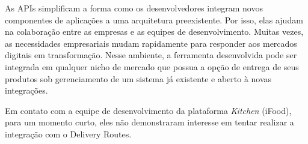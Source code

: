 As APIs simplificam a forma como os desenvolvedores integram novos componentes de aplicações a uma arquitetura preexistente. Por isso, elas ajudam na colaboração entre as empresas e as equipes de desenvolvimento. Muitas vezes, as necessidades empresariais mudam rapidamente para responder aos mercados digitais em transformação. Nesse ambiente, a ferramenta desenvolvida pode ser integrada em qualquer nicho de mercado que possua a opção de entrega de seus produtos sob gerenciamento de um sistema já existente e aberto à novas integrações.

Em contato com a equipe de desenvolvimento da plataforma \textit{Kitchen} (iFood), para um momento curto, eles não demonstraram interesse em tentar realizar a integração com o Delivery Routes.